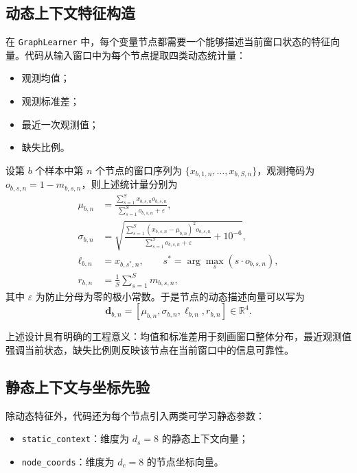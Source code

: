 \subsection{动态上下文特征构造}

在 \texttt{GraphLearner} 中，每个变量节点都需要一个能够描述当前窗口状态的特征向量。代码从输入窗口中为每个节点提取四类动态统计量：
\begin{itemize}
    \item 观测均值；
    \item 观测标准差；
    \item 最近一次观测值；
    \item 缺失比例。
\end{itemize}

设第 $b$ 个样本中第 $n$ 个节点的窗口序列为 $\{x_{b,1,n}, \ldots, x_{b,S,n}\}$，观测掩码为 $o_{b,s,n}=1-m_{b,s,n}$，则上述统计量分别为
\begin{align}
    \mu_{b,n} &= \frac{\sum_{s=1}^{S} x_{b,s,n} o_{b,s,n}}
    {\sum_{s=1}^{S} o_{b,s,n} + \varepsilon}, \\
    \sigma_{b,n} &= \sqrt{
        \frac{\sum_{s=1}^{S}\left(x_{b,s,n} - \mu_{b,n}\right)^2 o_{b,s,n}}
        {\sum_{s=1}^{S} o_{b,s,n} + \varepsilon}
        + 10^{-6}}, \\
    \ell_{b,n} &= x_{b,s^\ast,n}, \qquad
    s^\ast = \arg\max_{s}(s \cdot o_{b,s,n}), \\
    r_{b,n} &= \frac{1}{S}\sum_{s=1}^{S} m_{b,s,n},
\end{align}
其中 $\varepsilon$ 为防止分母为零的极小常数。于是节点的动态描述向量可以写为
\begin{equation}
    \mathbf{d}_{b,n} = [\mu_{b,n}, \sigma_{b,n}, \ell_{b,n}, r_{b,n}] \in \mathbb{R}^{4}.
\end{equation}

上述设计具有明确的工程意义：均值和标准差用于刻画窗口整体分布，最近观测值强调当前状态，缺失比例则反映该节点在当前窗口中的信息可靠性。

\subsection{静态上下文与坐标先验}

除动态特征外，代码还为每个节点引入两类可学习静态参数：
\begin{itemize}
    \item \texttt{static\_context}：维度为 $d_s=8$ 的静态上下文向量；
    \item \texttt{node\_coords}：维度为 $d_c=8$ 的节点坐标向量。
\end{itemize}

